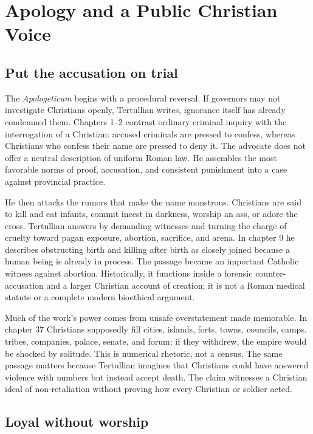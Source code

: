 \section{Apology and a Public Christian Voice}

\subsection{Put the accusation on trial}

The \emph{Apologeticum} begins with a procedural reversal. If governors may
not investigate Christians openly, Tertullian writes, ignorance itself has
already condemned them. Chapters 1--2 contrast ordinary criminal inquiry with
the interrogation of a Christian: accused criminals are pressed to confess,
whereas Christians who confess their name are pressed to deny it. The advocate
does not offer a neutral description of uniform Roman law. He assembles the
most favorable norms of proof, accusation, and consistent punishment into a
case against provincial practice.

He then attacks the rumors that make the name monstrous. Christians are said to
kill and eat infants, commit incest in darkness, worship an ass, or adore the
cross. Tertullian answers by demanding witnesses and turning the charge of
cruelty toward pagan exposure, abortion, sacrifice, and arena. In chapter 9 he
describes obstructing birth and killing after birth as closely joined because a
human being is already in process. The passage became an important Catholic
witness against abortion. Historically, it functions inside a forensic
counter-accusation and a larger Christian account of creation; it is not a
Roman medical statute or a complete modern bioethical argument.

Much of the work's power comes from unsafe overstatement made memorable. In
chapter 37 Christians supposedly fill cities, islands, forts, towns, councils,
camps, tribes, companies, palace, senate, and forum; if they withdrew, the
empire would be shocked by solitude. This is numerical rhetoric, not a census.
The same passage matters because Tertullian imagines that Christians could have
answered violence with numbers but instead accept death. The claim witnesses a
Christian ideal of non-retaliation without proving how every Christian or
soldier acted.

\subsection{Loyal without worship}

